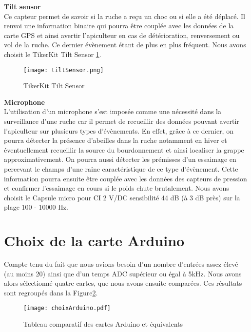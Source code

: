 \textbf{Tilt sensor}\\

Ce capteur permet de savoir si la ruche a reçu un choc ou si elle a été déplacé. Il renvoi une information binaire qui pourra être couplée avec les données de la carte GPS et ainsi avertir l'apiculteur en cas de détérioration, renversement ou vol de la ruche. Ce dernier évènement étant de plus en plus fréquent.
Nous avons choisit le TikerKit Tilt Sensor \ref{fig:tiltSensor}.\\

\begin{figure}[h]
\centering\texttt{[image: tiltSensor.png]}
\caption{\label{fig:tiltSensor} TikerKit Tilt Sensor}
\end{figure} 
     

\textbf{Microphone}\\

L'utilisation d'un microphone s'est imposée comme une nécessité dans la surveillance d'une ruche car il permet de recueillir des données pouvant avertir l'apiculteur sur plusieurs types d'évènements. En effet, grâce à ce dernier, on pourra détecter la présence d'abeilles dans la ruche notamment en hiver et éventuellement recueillir la source du bourdonnement et ainsi localiser la grappe approximativement. On pourra aussi détecter les prémisses d'un essaimage en percevant le champs d'une raine caractéristique de ce type d'évènement. Cette information pourra ensuite être couplée avec les données des capteurs de pression et confirmer l'essaimage en cours si le poids chute brutalement. 
Nous avons choisit le Capsule micro pour CI 2 V/DC sensibilité 44 dB (à 3 dB près) sur la plage 100 - 10000 Hz. 

\section{Choix de la carte Arduino}
\vspace{1.5cm}

Compte tenu du fait que nous avions besoin d'un nombre d'entrées assez élevé (au moins 20) ainsi que d'un temps ADC supérieur ou égal à 5kHz. Nous avons alors sélectionné quatre cartes, que nous avons ensuite comparées. Ces résultats sont regroupés dans la Figure\ref{fig:choixardui}.

\begin{figure}[h]
\centering\texttt{[image: choixArduino.pdf]}
\caption{\label{fig:choixardui} Tableau comparatif des cartes Arduino et équivalents}
\end{figure} 


